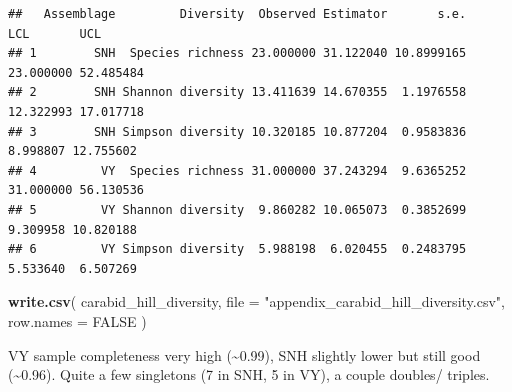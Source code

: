\documentclass[
]{article}
\newenvironment{Shaded}{\begin{snugshade}}{\end{snugshade}}
\newcommand{\AttributeTok}[1]{\textcolor[rgb]{0.13,0.29,0.53}{#1}}
\newcommand{\CommentTok}[1]{\textcolor[rgb]{0.56,0.35,0.01}{\textit{#1}}}
\newcommand{\ConstantTok}[1]{\textcolor[rgb]{0.56,0.35,0.01}{#1}}
\newcommand{\DecValTok}[1]{\textcolor[rgb]{0.00,0.00,0.81}{#1}}
\newcommand{\FunctionTok}[1]{\textcolor[rgb]{0.13,0.29,0.53}{\textbf{#1}}}
\newcommand{\NormalTok}[1]{#1}
\newcommand{\OtherTok}[1]{\textcolor[rgb]{0.56,0.35,0.01}{#1}}
\newcommand{\SpecialCharTok}[1]{\textcolor[rgb]{0.81,0.36,0.00}{\textbf{#1}}}
\newcommand{\StringTok}[1]{\textcolor[rgb]{0.31,0.60,0.02}{#1}}
\begin{document}
\begin{Shaded}
\end{Shaded}

\begin{verbatim}
##   Assemblage         Diversity  Observed Estimator       s.e.       LCL       UCL
## 1        SNH  Species richness 23.000000 31.122040 10.8999165 23.000000 52.485484
## 2        SNH Shannon diversity 13.411639 14.670355  1.1976558 12.322993 17.017718
## 3        SNH Simpson diversity 10.320185 10.877204  0.9583836  8.998807 12.755602
## 4         VY  Species richness 31.000000 37.243294  9.6365252 31.000000 56.130536
## 5         VY Shannon diversity  9.860282 10.065073  0.3852699  9.309958 10.820188
## 6         VY Simpson diversity  5.988198  6.020455  0.2483795  5.533640  6.507269
\end{verbatim}

\begin{Shaded}
\begin{Highlighting}[]
\FunctionTok{write.csv}\NormalTok{(}
\NormalTok{  carabid\_hill\_diversity,}
  \AttributeTok{file =} \StringTok{"appendix\_carabid\_hill\_diversity.csv"}\NormalTok{,}
  \AttributeTok{row.names =} \ConstantTok{FALSE}
\NormalTok{)}
\end{Highlighting}
\end{Shaded}

VY sample completeness very high (\textasciitilde0.99), SNH slightly
lower but still good (\textasciitilde0.96). Quite a few singletons (7 in
SNH, 5 in VY), a couple doubles/ triples.
\end{document}
